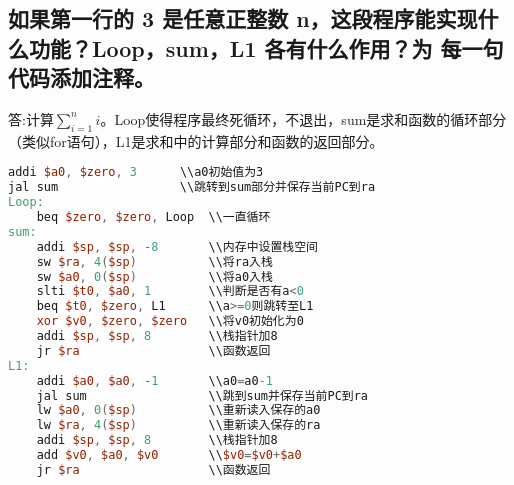 \documentclass{ctexart}
\begin{document}
        \subsection {如果第一行的 3 是任意正整数 n，这段程序能实现什么功能？Loop，sum，L1 各有什么作用？为
            每一句代码添加注释。}
            答:计算$\sum_{i=1}^ni$。Loop使得程序最终死循环，不退出，sum是求和函数的循环部分（类似for语句），L1是求和中的计算部分和函数的返回部分。
        \begin{lstlisting}[language=verilog]
addi $a0, $zero, 3      \\a0初始值为3
jal sum                 \\跳转到sum部分并保存当前PC到ra
Loop:
    beq $zero, $zero, Loop  \\一直循环
sum:
    addi $sp, $sp, -8       \\内存中设置栈空间
    sw $ra, 4($sp)          \\将ra入栈
    sw $a0, 0($sp)          \\将a0入栈
    slti $t0, $a0, 1        \\判断是否有a<0
    beq $t0, $zero, L1      \\a>=0则跳转至L1
    xor $v0, $zero, $zero   \\将v0初始化为0
    addi $sp, $sp, 8        \\栈指针加8
    jr $ra                  \\函数返回
L1:
    addi $a0, $a0, -1       \\a0=a0-1
    jal sum                 \\跳到sum并保存当前PC到ra
    lw $a0, 0($sp)          \\重新读入保存的a0
    lw $ra, 4($sp)          \\重新读入保存的ra
    addi $sp, $sp, 8        \\栈指针加8
    add $v0, $a0, $v0       \\$v0=$v0+$a0
    jr $ra                  \\函数返回
        \end{lstlisting}
\end{document}
